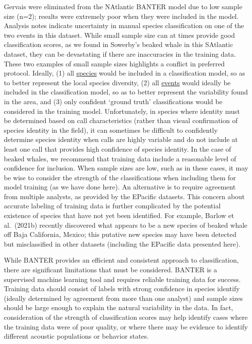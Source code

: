 \documentclass[
  letterpaper,
  DIV=11,
  numbers=noendperiod]{scrartcl}
\begin{document}
Gervais were eliminated from the NAtlantic BANTER model due to low
sample size (n=2); results were extremely poor when they were included
in the model. Analysis notes indicate uncertainty in manual species
classification on one of the two events in this dataset. While small
sample size can at times provide good classification scores, as we found
in Sowerby's beaked whale in this SAtlantic dataset, they can be
devastating if there are inaccuracies in the training data. These two
examples of small sample sizes highlights a conflict in preferred
protocol. Ideally, (1) all \uline{species} would be included in a
classification model, so as to better represent the local species
diversity, (2) all \uline{events} would ideally be included in the
classification model, so as to better represent the variability found in
the area, and (3) only confident `ground truth' classifications would be
considered in the training model. Unfortunately, in species where
identity must be determined based on call characteristics (rather than
visual confirmation of species identity in the field), it can sometimes
be difficult to confidently determine species identity when calls are
highly variable and do not include at least one call that provides high
confidence of species identity. In the case of beaked whales, we
recommend that training data include a reasonable level of confidence
for inclusion. When sample sizes are low, such as in these cases, it may
be wise to consider the strength of the classifications when including
them for model training (as we have done here). An alternative is to
require agreement from multiple analysts, as provided by the EPacific
datasets. This concern about accurate labeling of training data is
further complicated by the potential existence of species that have not
yet been identified. For example, Barlow et al.~(2021b) recently
discovered what appears to be a new species of beaked whale off Baja
California, Mexico; this putative new species may have been detected but
misclassified in other datasets (including the EPacific data presented
here).

While BANTER provides an efficient and consistent approach to
classification, there are significant limitations that must be
considered. BANTER is a supervised machine learning tool and requires
reliable training data for success. Training data should consist of
labels with strong confidence in species identify (ideally determined by
agreement from more than one analyst) and sample sizes should be large
enough to explain the natural variability in the data. In fact,
consideration of the strength of classification scores may help identify
cases where the training data were of poor quality, or where there may
be evidence to identify different acoustic populations or behavior
states.
\end{document}
